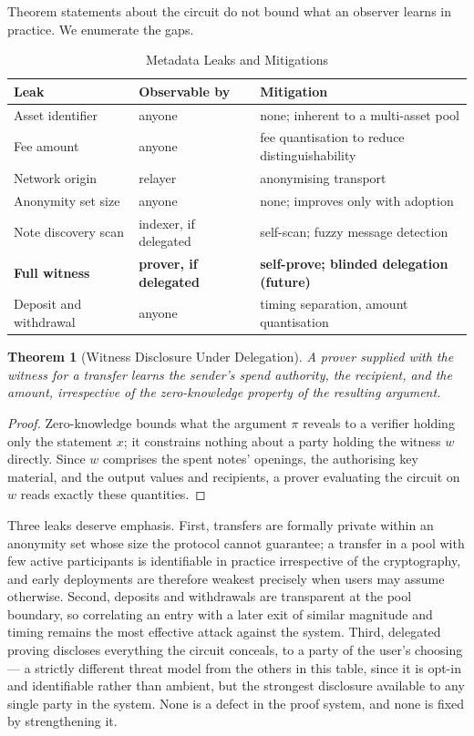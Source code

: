 \documentclass[11pt,a4paper]{article}
\newtheorem{theorem}{Theorem}[section]
\begin{document}
Theorem statements about the circuit do not bound what an observer learns in practice. We enumerate the gaps.

\begin{table}[h]
\centering
\caption{Metadata Leaks and Mitigations}
\begin{tabular}{@{}llp{4.6cm}@{}}
\toprule
\textbf{Leak} & \textbf{Observable by} & \textbf{Mitigation} \\ \midrule
Asset identifier & anyone & none; inherent to a multi-asset pool \\
Fee amount & anyone & fee quantisation to reduce distinguishability \\
Network origin & relayer & anonymising transport \\
Anonymity set size & anyone & none; improves only with adoption \\
Note discovery scan & indexer, if delegated & self-scan; fuzzy message detection \\
\textbf{Full witness} & \textbf{prover, if delegated} & \textbf{self-prove; blinded delegation (future)} \\
Deposit and withdrawal & anyone & timing separation, amount quantisation \\ \bottomrule
\end{tabular}
\end{table}

\begin{theorem}[Witness Disclosure Under Delegation]
\label{thm:witness-sec}
A prover supplied with the witness for a transfer learns the sender's spend authority, the recipient, and the amount, irrespective of the zero-knowledge property of the resulting argument.
\end{theorem}

\begin{proof}
Zero-knowledge bounds what the argument $\pi$ reveals to a verifier holding only the statement $x$; it constrains nothing about a party holding the witness $w$ directly. Since $w$ comprises the spent notes' openings, the authorising key material, and the output values and recipients, a prover evaluating the circuit on $w$ reads exactly these quantities.
\end{proof}

Three leaks deserve emphasis. First, transfers are formally private within an anonymity set whose size the protocol cannot guarantee; a transfer in a pool with few active participants is identifiable in practice irrespective of the cryptography, and early deployments are therefore weakest precisely when users may assume otherwise. Second, deposits and withdrawals are transparent at the pool boundary, so correlating an entry with a later exit of similar magnitude and timing remains the most effective attack against the system. Third, delegated proving discloses everything the circuit conceals, to a party of the user's choosing --- a strictly different threat model from the others in this table, since it is opt-in and identifiable rather than ambient, but the strongest disclosure available to any single party in the system. None is a defect in the proof system, and none is fixed by strengthening it.
\end{document}
